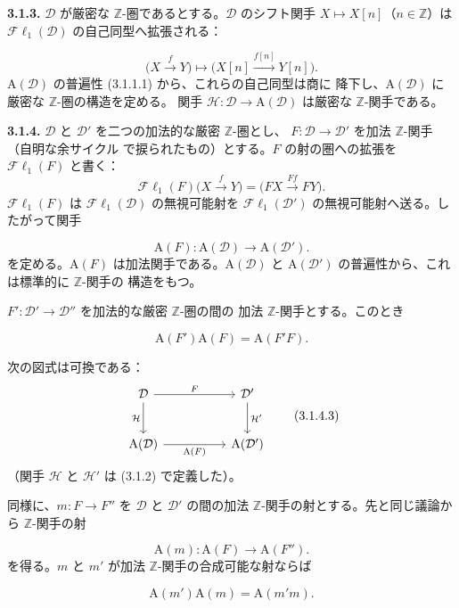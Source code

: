 \clearpage
{}%
\begingroup
\small
\setlength{\parskip}{0pt}%
\setlength{\emergencystretch}{1.5em}%

\noindent\textbf{3.1.3.}\quad
$\mathcal D$ が厳密な $\mathbb Z$-圏であるとする。$\mathcal D$ のシフト関手
$X\longmapsto X[n]$（$n\in\mathbb Z$）は
$\mathcal{F}\ell_1(\mathcal D)$ の自己同型へ拡張される：

\[
\bigl(X\xrightarrow{f}Y\bigr)
\longmapsto
\bigl(X[n]\xrightarrow{f[n]}Y[n]\bigr).
\]
$\mathrm A(\mathcal D)$ の普遍性 (3.1.1.1) から、これらの自己同型は商に
降下し、$\mathrm A(\mathcal D)$ に厳密な $\mathbb Z$-圏の構造を定める。
関手 $\mathcal H\colon\mathcal D\to\mathrm A(\mathcal D)$ は厳密な
$\mathbb Z$-関手である。

\medskip
\noindent\textbf{3.1.4.}\quad
$\mathcal D$ と $\mathcal D'$ を二つの加法的な厳密 $\mathbb Z$-圏とし、
$F\colon\mathcal D\to\mathcal D'$ を加法 $\mathbb Z$-関手（自明な余サイクル
で捩られたもの）とする。$F$ の射の圏への拡張を
$\mathcal{F}\ell_1(F)$ と書く：
\[
\mathcal{F}\ell_1(F)\bigl(X\xrightarrow{f}Y\bigr)
=\bigl(FX\xrightarrow{Ff}FY\bigr).
\]
$\mathcal{F}\ell_1(F)$ は $\mathcal{F}\ell_1(\mathcal D)$ の無視可能射を
$\mathcal{F}\ell_1(\mathcal D')$ の無視可能射へ送る。したがって関手

\[
\mathrm A(F)\colon\mathrm A(\mathcal D)\longrightarrow\mathrm A(\mathcal D').
\tag{3.1.4.1}
\]
を定める。$\mathrm A(F)$ は加法関手である。$\mathrm A(\mathcal D)$ と
$\mathrm A(\mathcal D')$ の普遍性から、これは標準的に $\mathbb Z$-関手の
構造をもつ。

$F'\colon\mathcal D'\to\mathcal D''$ を加法的な厳密 $\mathbb Z$-圏の間の
加法 $\mathbb Z$-関手とする。このとき

\[
\mathrm A(F')\mathrm A(F)=\mathrm A(F'F).
\tag{3.1.4.2}
\]

次の図式は可換である：
\[
\begin{tikzcd}[column sep=5em,row sep=2.5em]
\mathcal D \arrow[r,"F"] \arrow[d,"\mathcal H"'] &
\mathcal D' \arrow[d,"\mathcal H'"] \\
\mathrm A(\mathcal D) \arrow[r,"\mathrm A(F)"'] &
\mathrm A(\mathcal D')
\end{tikzcd}
\tag{3.1.4.3}
\]
（関手 $\mathcal H$ と $\mathcal H'$ は (3.1.2) で定義した）。

同様に、$m\colon F\to F''$ を $\mathcal D$ と $\mathcal D'$ の間の加法
$\mathbb Z$-関手の射とする。先と同じ議論から $\mathbb Z$-関手の射

\[
\mathrm A(m)\colon\mathrm A(F)\longrightarrow\mathrm A(F'').
\tag{3.1.4.4}
\]
を得る。$m$ と $m'$ が加法 $\mathbb Z$-関手の合成可能な射ならば

\[
\mathrm A(m')\mathrm A(m)=\mathrm A(m'm).
\tag{3.1.4.5}
\]
\endgroup
